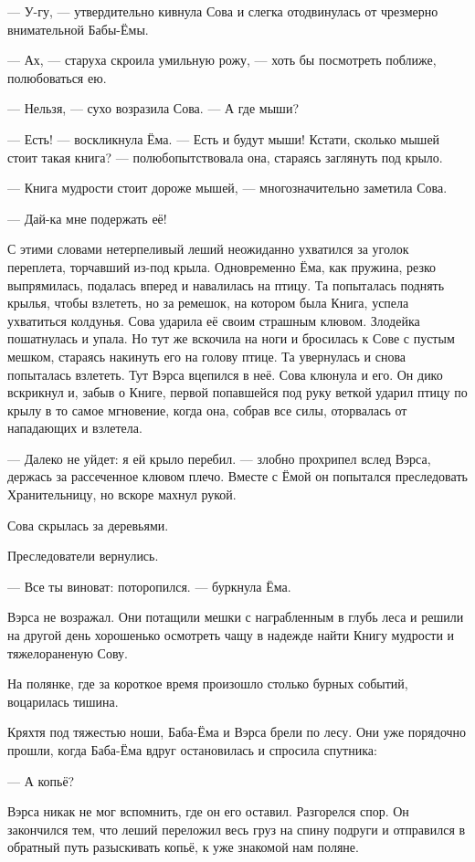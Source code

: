 \documentclass[12pt, a4paper, openany]{book}
\begin{document}
	— У-гу, — утвердительно кивнула Сова и слегка отодвинулась от чрезмерно внимательной Бабы-Ёмы.
	
	— Ах, — старуха скроила умильную рожу, — хоть бы посмотреть поближе, полюбоваться ею.
	
	— Нельзя, — сухо возразила Сова. — А где мыши?
	
	— Есть! — воскликнула Ёма. — Есть и будут мыши! Кстати, сколько мышей стоит такая книга? — полюбопытствовала она, стараясь заглянуть под крыло.
	
	— Книга мудрости стоит дороже мышей, — многозначительно заметила Сова.
	
	— Дай-ка мне подержать её!
	
	С этими словами нетерпеливый леший неожиданно ухватился за уголок переплета, торчавший из-под крыла. Одновременно Ёма, как пружина, резко выпрямилась, подалась вперед и навалилась на птицу. Та попыталась поднять крылья, чтобы взлететь, но за ремешок, на котором была Книга, успела ухватиться колдунья. Сова ударила её своим страшным клювом. Злодейка пошатнулась и упала. Но тут же вскочила на ноги и бросилась к Сове с пустым мешком, стараясь накинуть его на голову птице. Та увернулась и снова попыталась взлететь. Тут Вэрса вцепился в неё. Сова клюнула и его. Он дико вскрикнул и, забыв о Книге, первой попавшейся под руку веткой ударил птицу по крылу в то самое мгновение, когда она, собрав все силы, оторвалась от нападающих и взлетела.
	
	— Далеко не уйдет: я ей крыло перебил. — злобно прохрипел вслед Вэрса, держась за рассеченное клювом плечо. Вместе с Ёмой он попытался преследовать Хранительницу, но вскоре махнул рукой.
	
	Сова скрылась за деревьями.
	
	Преследователи вернулись.
	
	— Все ты виноват: поторопился. — буркнула Ёма.
	
	Вэрса не возражал. Они потащили мешки с награбленным в глубь леса и решили на другой день хорошенько осмотреть чащу в надежде найти Книгу мудрости и тяжелораненую Сову.
	
	На полянке, где за короткое время произошло столько бурных событий, воцарилась тишина.
	
	Кряхтя под тяжестью ноши, Баба-Ёма и Вэрса брели по лесу. Они уже порядочно прошли, когда Баба-Ёма вдруг остановилась и спросила спутника:
	
	— А копьё?
	
	Вэрса никак не мог вспомнить, где он его оставил. Разгорелся спор. Он закончился тем, что леший переложил весь груз на спину подруги и отправился в обратный путь разыскивать копьё, к уже знакомой нам поляне.
	
\end{document}
